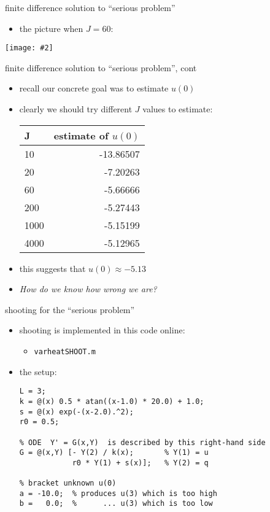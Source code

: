 \documentclass[10pt,hyperref]{beamer}
\newcommand{\centerimage}[2]{\begin{center}
\texttt{[image: \#2]}
\end{center}}
\begin{document}
\begin{frame}{finite difference solution to ``serious problem''} 

\begin{itemize}
\item the picture when $J=60$:
\end{itemize}

\centerimage{0.7}{resultFD-crop}
\end{frame}

\begin{frame}{finite difference solution to ``serious problem'', cont} 

\begin{itemize}
\item recall our concrete goal was to estimate $u(0)$ 
\item clearly we should try different $J$ values to estimate:
\medskip
\begin{center}
\begin{tabular}{l|r}
J & estimate of $u(0)$ \\ \hline
10 & -13.86507 \\
20 & -7.20263 \\
60 &  -5.66666 \\
200 & -5.27443 \\
1000 & -5.15199 \\
4000 & -5.12965
\end{tabular}
\end{center}
\bigskip

\item this suggests that $u(0)\approx -5.13$
\item \emph{How do we know how wrong we are?}
\end{itemize}

\end{frame}

\begin{frame}[fragile]{shooting for the ``serious problem''} 

\begin{itemize}
\item shooting is implemented in this code online:
  \begin{itemize}
  \item \texttt{varheatSHOOT.m}
  \end{itemize}
\bigskip

\item the setup:
\scriptsize
\begin{verbatim}
L = 3;
k = @(x) 0.5 * atan((x-1.0) * 20.0) + 1.0;
s = @(x) exp(-(x-2.0).^2);
r0 = 0.5;

% ODE  Y' = G(x,Y)  is described by this right-hand side
G = @(x,Y) [- Y(2) / k(x);       % Y(1) = u 
            r0 * Y(1) + s(x)];   % Y(2) = q

% bracket unknown u(0)
a = -10.0;  % produces u(3) which is too high
b =   0.0;  %      ... u(3) which is too low
\end{verbatim}
\normalsize
\end{itemize}
\end{frame}
\end{document}
